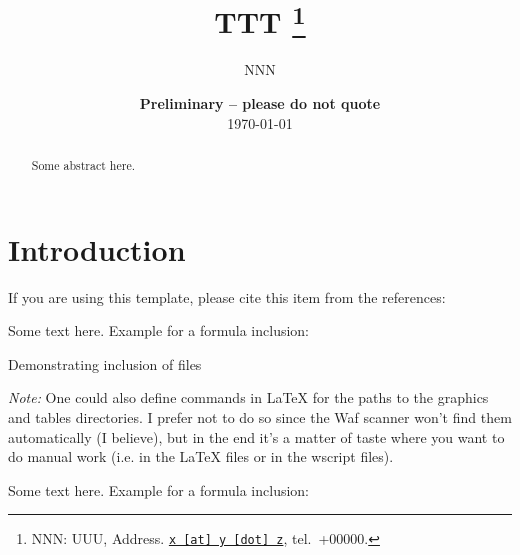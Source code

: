\documentclass[11pt, a4paper, leqno]{article}
\begin{document}
\title{TTT
\thanks{NNN: UUU, Address. \href{mailto:x@y.z} {\nolinkurl{x [at] y [dot] z}}, tel.~+00000.}
}

\author{NNN
}

\date{
{\bf Preliminary -- please do not quote} 
\\[1ex] 
\today
}

\maketitle


\begin{abstract}
	Some abstract here.
\end{abstract}
\clearpage

\section{Introduction} %
\label{sec:introduction}

If you are using this template, please cite this item from the references: \citet{Gaudecker13}

Some text here. Example for a formula inclusion:



\begin{table}[h!]
    \caption{Demonstrating inclusion of files}
    \label{tab:demonstrating_inclusion_of_files}
    \begin{center}
        
    \end{center}
    \footnotesize
    \emph{Note:} One could also define commands in {\LaTeX} for the paths to the graphics and tables directories. I prefer not to do so since the Waf scanner won't find them automatically (I believe), but in the end it's a matter of taste where you want to do manual work (i.e. in the {\LaTeX} files or in the wscript files).
\end{table}


Some text here. Example for a formula inclusion:

    
\end{document}
